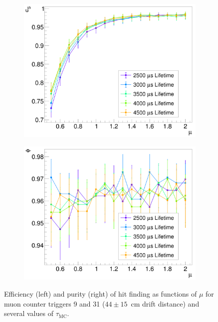 \documentclass[10pt,a4paper]{article}
\begin{document}
\begin{figure}
\centering
\begin{subfigure}{0.45\textwidth}
\centering
\includegraphics[width=\textwidth]{effvnoise.png}
\end{subfigure}
\begin{subfigure}{0.45\textwidth}
\centering
\includegraphics[width=\textwidth]{purvnoise.png}
\end{subfigure}
\caption{Efficiency (left) and purity (right) of hit finding as functions of $\mu$ for muon counter triggers 9 and 31 ($44\pm15$~cm drift distance) and several values of $\tau_{\text{MC}}$.}
\label{fig:pureffvnoise}
\end{figure}
\end{document}
